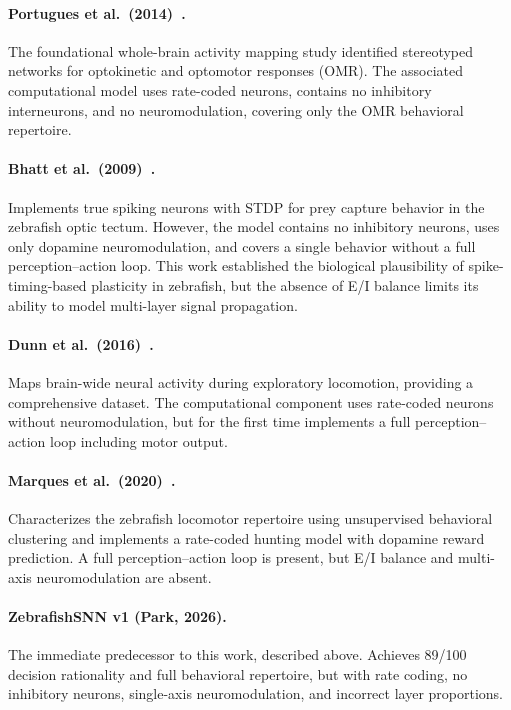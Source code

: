 \documentclass[11pt,a4paper]{article}
\begin{document}
\paragraph{Portugues et al.\ (2014)~\cite{portugues2014}.}
The foundational whole-brain activity mapping study identified
stereotyped networks for optokinetic and optomotor responses (OMR).
The associated computational model uses rate-coded neurons, contains
no inhibitory interneurons, and no neuromodulation, covering only
the OMR behavioral repertoire.

\paragraph{Bhatt et al.\ (2009)~\cite{bhatt2009}.}
Implements true spiking neurons with STDP for prey capture behavior
in the zebrafish optic tectum.
However, the model contains no inhibitory neurons, uses only dopamine
neuromodulation, and covers a single behavior without a full
perception--action loop.
This work established the biological plausibility of spike-timing-based
plasticity in zebrafish, but the absence of E/I balance limits its
ability to model multi-layer signal propagation.

\paragraph{Dunn et al.\ (2016)~\cite{dunn2016}.}
Maps brain-wide neural activity during exploratory locomotion,
providing a comprehensive dataset.
The computational component uses rate-coded neurons without
neuromodulation, but for the first time implements a full
perception--action loop including motor output.

\paragraph{Marques et al.\ (2020)~\cite{marques2020}.}
Characterizes the zebrafish locomotor repertoire using unsupervised
behavioral clustering and implements a rate-coded hunting model
with dopamine reward prediction.
A full perception--action loop is present, but E/I balance and
multi-axis neuromodulation are absent.

\paragraph{ZebrafishSNN v1 (Park, 2026).}
The immediate predecessor to this work, described above.
Achieves 89/100 decision rationality and full behavioral repertoire,
but with rate coding, no inhibitory neurons, single-axis
neuromodulation, and incorrect layer proportions.
\end{document}
